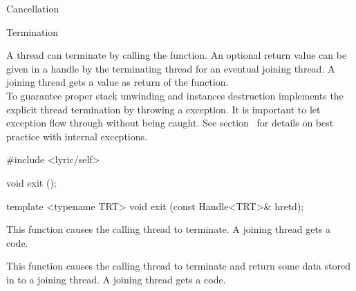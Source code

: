\begin{manpage}{Cancellation}
\renewcommand{\manlayout}{\savedmanlayout}
\end{manpage}


\begin{manpage}{Termination}
\let\savedmanlayout=\manlayout
\renewcommand{\manlayout}{vcompact}

A thread can terminate by calling the  function.
An optional return value can be given in a handle by the terminating thread for an eventual joining thread.
A joining thread gets a  value as return of the  function.
\\
To guarantee proper stack unwinding and instances destruction \lisle implements the explicit thread termination by throwing a  exception.
It is important to let exception  flow through without being caught.
See section~ for details on best practice with \lisle internal exceptions.

\begin{mansynopsis}
#include <lyric/self>

void exit ();

template <typename TRT>
void exit (const Handle<TRT>& hretd);
\end{mansynopsis}

\begin{mandescription}
    This function causes the calling thread to terminate.
    A joining thread gets a  code.

    This function causes the calling thread to terminate and return some data stored in  to a joining thread.
    A joining thread gets a  code.
\end{mandescription}

\renewcommand{\manlayout}{\savedmanlayout}
\end{manpage}

